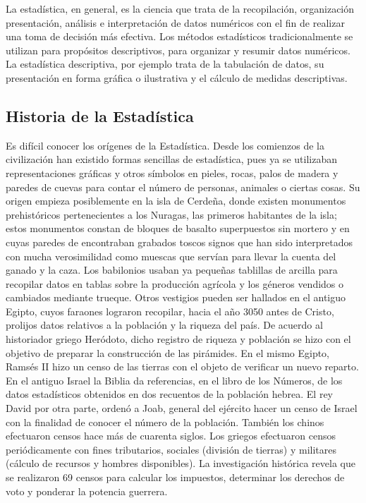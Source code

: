 \documentclass[a4paper]{report} %
\begin{document}
La estad\'istica, en general, es la ciencia que trata de la recopilaci\'on, organizaci\'on presentaci\'on, an\'alisis e interpretaci\'on de datos num\'ericos con el fin de realizar una toma de decisi\'on m\'as efectiva. Los m\'etodos estad\'isticos tradicionalmente se utilizan para prop\'ositos descriptivos, para organizar y resumir datos num\'ericos. La estad\'istica descriptiva, por ejemplo trata de la tabulaci\'on de datos, su presentaci\'on en forma gr\'afica o ilustrativa y el c\'alculo de medidas descriptivas.

\subsection{Historia de la Estad\'istica}
Es dif\'icil conocer los or\'igenes de la Estad\'istica. Desde los comienzos de la civilizaci\'on han existido formas sencillas de estad\'istica, pues ya se utilizaban representaciones gr\'aficas y otros s\'imbolos en pieles, rocas, palos de madera y paredes de cuevas para contar el n\'umero de personas, animales o ciertas cosas. Su origen empieza posiblemente en la isla de Cerde\~na, donde existen monumentos prehist\'oricos pertenecientes a los Nuragas, las primeros habitantes de la isla; estos monumentos constan de bloques de basalto superpuestos sin mortero y en cuyas paredes de encontraban grabados toscos signos que han sido interpretados con mucha verosimilidad como muescas que serv\'ian para llevar la cuenta del ganado y la caza. Los babilonios usaban ya peque\~nas tablillas de arcilla para recopilar datos en tablas sobre la producci\'on agr\'icola y los g\'eneros vendidos o cambiados mediante trueque. Otros vestigios pueden ser hallados en el antiguo Egipto, cuyos faraones lograron recopilar, hacia el a\~no 3050 antes de Cristo, prolijos datos relativos a la poblaci\'on y la riqueza del pa\'is. De acuerdo al historiador griego Her\'odoto, dicho registro de riqueza y poblaci\'on se hizo con el objetivo de preparar la construcci\'on de las pir\'amides. En el mismo Egipto, Rams\'es II hizo un censo de las tierras con el objeto de verificar un nuevo reparto. En el antiguo Israel la Biblia da referencias, en el libro de los N\'umeros, de los datos estad\'isticos obtenidos en dos recuentos de la poblaci\'on hebrea. El rey David por otra parte, orden\'o a Joab, general del ej\'ercito hacer un censo de Israel con la finalidad de conocer el n\'umero de la poblaci\'on. Tambi\'en los chinos efectuaron censos hace m\'as de cuarenta siglos. Los griegos efectuaron censos peri\'odicamente con fines tributarios, sociales (divisi\'on de tierras) y militares (c\'alculo de recursos y hombres disponibles). La investigaci\'on hist\'orica revela que se realizaron 69 censos para calcular los impuestos, determinar los derechos de voto y ponderar la potencia guerrera. \medskip
\end{document}
